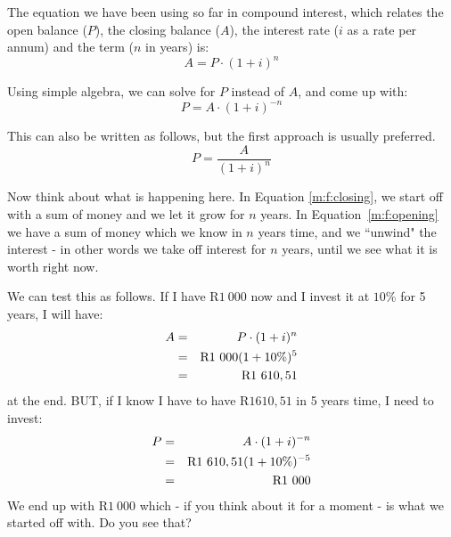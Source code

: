 The equation we have been using so far in compound interest, which relates the open balance ($P$), the closing balance ($A$), the interest rate ($i$ as a rate per annum) and the term ($n$ in years) is:
\begin{equation}
A = P \cdot (1+i)^n
\label{m:f:closing}
\end{equation}

Using simple algebra, we can solve for $P$ instead of $A$, and come up with:
\begin{equation}
P = A \cdot (1+i)^{-n}
\label{m:f:opening}
\end{equation}

This can also be written as follows, but the first approach is usually preferred.
\begin{equation}
P = \frac{A}{(1+i)^n}
\label{m:f:opening2}
\end{equation}

Now think about what is happening here. In Equation \ref{m:f:closing}, we start off with a sum of money and we let it grow for $n$ years. In Equation~\ref{m:f:opening} we have a sum of money which we know in $n$ years time, and we ``unwind" the interest - in other words we take off interest for $n$ years, until we see what it is worth right now.

We can test this as follows. If I have R$1~000$ now and I invest it at $10\%$ for 5 years, I will have:
\begin{eqnarray*}
A &=& P \cdot (1+i)^n\\
&=&\rm{R}1~000(1+10\%)^5\\
&=&\rm{R}1~610,51
\end{eqnarray*}
at the end. BUT, if I know I have to have R$1 610,51$ in 5 years time, I need to invest:
\begin{eqnarray*}
P &=& A \cdot (1+i)^{-n}\\
&=&\rm{R}1~610,51(1+10\%)^{-5}\\
&=&\rm{R}1~000
\end{eqnarray*}
We end up with R$1~000$ which - if you think about it for a moment - is what we started off with. Do you see that?

